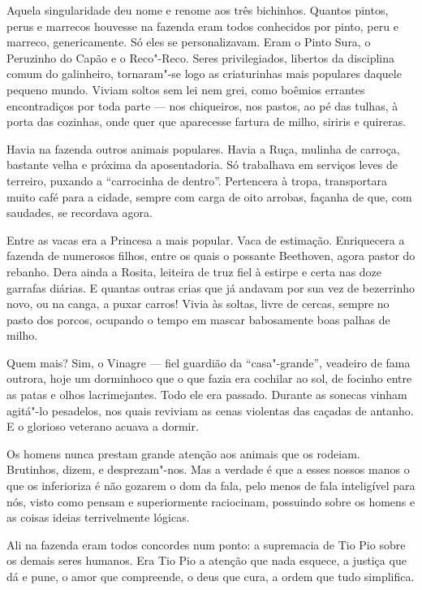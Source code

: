 Aquela singularidade deu nome e renome aos três bichinhos. Quantos
pintos, perus e marrecos houvesse na fazenda eram todos conhecidos por
pinto, peru e marreco, genericamente. Só eles se personalizavam. Eram o
Pinto Sura, o Peruzinho do Capão e o Reco"-Reco. Seres privilegiados,
libertos da disciplina comum do galinheiro, tornaram"-se logo as
criaturinhas mais populares daquele pequeno mundo. Viviam soltos sem lei
nem grei, como boêmios errantes encontradiços por toda parte --- nos
chiqueiros, nos pastos, ao pé das tulhas, à porta das cozinhas, onde
quer que aparecesse fartura de milho, siriris e quireras.

Havia na fazenda outros animais populares. Havia a Ruça, mulinha de
carroça, bastante velha e próxima da aposentadoria. Só trabalhava em
serviços leves de terreiro, puxando a ``carrocinha de dentro''.
Pertencera à tropa, transportara muito café para a cidade, sempre com
carga de oito arrobas, façanha de que, com saudades, se recordava agora.

Entre as vacas era a Princesa a mais popular. Vaca de estimação.
Enriquecera a fazenda de numerosos filhos, entre os quais o possante
Beethoven, agora pastor do rebanho. Dera ainda a Rosita, leiteira de
truz fiel à estirpe e certa nas doze garrafas diárias. E quantas outras
crias que já andavam por sua vez de bezerrinho novo, ou na canga, a
puxar carros! Vivia às soltas, livre de cercas, sempre no pasto dos
porcos, ocupando o tempo em mascar babosamente boas palhas de milho.

Quem mais? Sim, o Vinagre --- fiel guardião da ``casa"-grande'', veadeiro
de fama outrora, hoje um dorminhoco que o que fazia era cochilar ao sol,
de focinho entre as patas e olhos lacrimejantes. Todo ele era passado.
Durante as sonecas vinham agitá"-lo pesadelos, nos quais reviviam as
cenas violentas das caçadas de antanho. E o glorioso veterano acuava a
dormir.

Os homens nunca prestam grande atenção aos animais que os rodeiam.
Brutinhos, dizem, e desprezam"-nos. Mas a verdade é que a esses nossos
manos o que os inferioriza é não gozarem o dom da fala, pelo menos de
fala inteligível para nós, visto como pensam e superiormente raciocinam,
possuindo sobre os homens e as coisas ideias terrivelmente lógicas.

Ali na fazenda eram todos concordes num ponto: a supremacia de Tio Pio
sobre os demais seres humanos. Era Tio Pio a atenção que nada esquece, a
justiça que dá e pune, o amor que compreende, o deus que cura, a ordem
que tudo simplifica.

